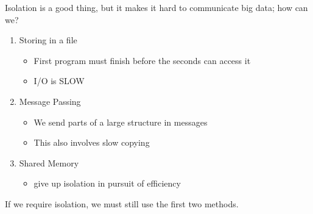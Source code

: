\documentclass[../../lecture_notes.tex]{subfiles}
\begin{document}
Isolation is a good thing, but it makes it hard to communicate big data; how can we?
\begin{enumerate}
\item Storing in a file
	\begin{itemize}
	\item First program must finish before the seconds can access it
	\item I/O is SLOW
	\end{itemize}
\item Message Passing
	\begin{itemize}
	\item We send parts of a large structure in messages
	\item This also involves slow copying
	\end{itemize}
\item Shared Memory
	\begin{itemize}
	\item give up isolation in pursuit of efficiency
	\end{itemize}
\end{enumerate}
If we require isolation, we must still use the first two methods.

\begin{center}
\end{center}
\end{document}
